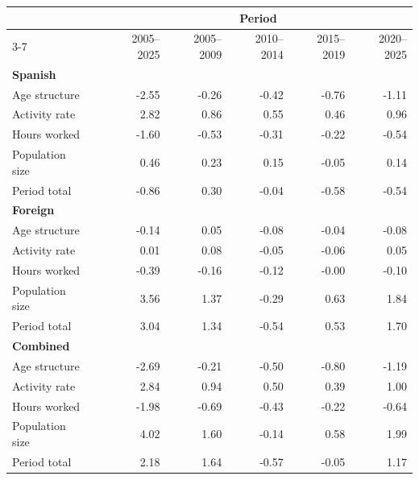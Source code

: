 \begin{tabular*}{\textwidth}{@{\extracolsep{\fill}}lcrrrrr}
\toprule
\multicolumn{1}{c}{\bfseries }&\multicolumn{1}{c}{\bfseries }&\multicolumn{5}{c}{\bfseries Period}\tabularnewline
\cline{3-7}
\multicolumn{1}{l}{}&\multicolumn{1}{c}{}&\multicolumn{1}{r}{2005--2025}&\multicolumn{1}{r}{2005--2009}&\multicolumn{1}{r}{2010--2014}&\multicolumn{1}{r}{2015--2019}&\multicolumn{1}{r}{2020--2025}\tabularnewline
\midrule
\textbf{Spanish}&&&&&&\tabularnewline
\quad Age structure&&-2.55&-0.26&-0.42&-0.76&-1.11\tabularnewline
\quad Activity rate&&2.82&0.86&0.55&0.46&0.96\tabularnewline
\quad Hours worked&&-1.60&-0.53&-0.31&-0.22&-0.54\tabularnewline
\quad Population size&&0.46&0.23&0.15&-0.05&0.14\tabularnewline
\quad Period total&&-0.86&0.30&-0.04&-0.58&-0.54\tabularnewline
\textbf{Foreign}&&&&&&\tabularnewline
\quad Age structure&&-0.14&0.05&-0.08&-0.04&-0.08\tabularnewline
\quad Activity rate&&0.01&0.08&-0.05&-0.06&0.05\tabularnewline
\quad Hours worked&&-0.39&-0.16&-0.12&-0.00&-0.10\tabularnewline
\quad Population size&&3.56&1.37&-0.29&0.63&1.84\tabularnewline
\quad Period total&&3.04&1.34&-0.54&0.53&1.70\tabularnewline
\textbf{Combined}&&&&&&\tabularnewline
\quad Age structure&&-2.69&-0.21&-0.50&-0.80&-1.19\tabularnewline
\quad Activity rate&&2.84&0.94&0.50&0.39&1.00\tabularnewline
\quad Hours worked&&-1.98&-0.69&-0.43&-0.22&-0.64\tabularnewline
\quad Population size&&4.02&1.60&-0.14&0.58&1.99\tabularnewline
\quad Period total&&2.18&1.64&-0.57&-0.05&1.17\tabularnewline
\bottomrule
\end{tabular*}
